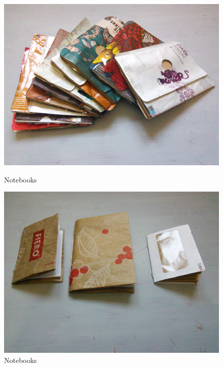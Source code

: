 \begin{figure}[!tbp]
  \centering
  \begin{minipage}[b]{0.48\textwidth}
    \includegraphics[width=\textwidth]{project_graphics/notebooks1.jpg}
    \caption{Notebooks}
    \label{fig:Notebooks1}
  \end{minipage}
  \hfill
  \begin{minipage}[b]{0.48\textwidth}
    \includegraphics[width=\textwidth]{project_graphics/notebooks2.jpg}
    \caption{Notebooks}
    \label{fig:Notebooks2}
  \end{minipage}
\end{figure}


